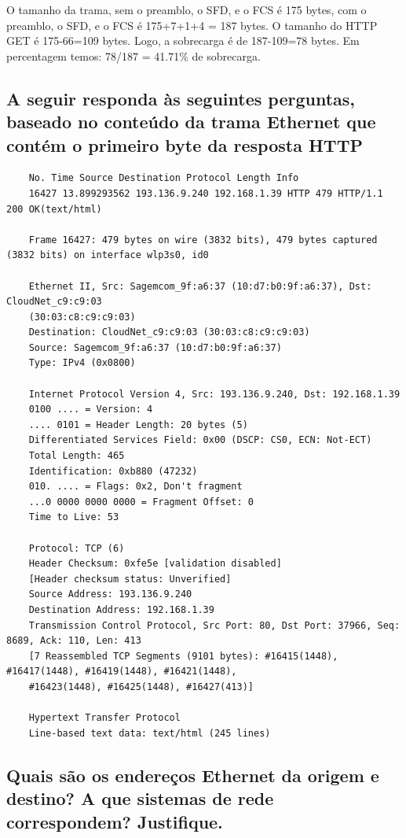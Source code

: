 O tamanho da trama, sem o preamblo, o SFD, e o FCS é 175 bytes, com o preamblo, o SFD, e o FCS é 175+7+1+4 = 187 bytes.
O tamanho do HTTP GET é 175-66=109 bytes. Logo, a sobrecarga é de 187-109=78 bytes.
Em percentagem temos: 78/187 = 41.71\% de sobrecarga.

\subsection*{A seguir responda às seguintes perguntas, baseado no conteúdo da trama Ethernet que
contém o primeiro byte da resposta HTTP}

\begin{verbatim}
    No. Time Source Destination Protocol Length Info
    16427 13.899293562 193.136.9.240 192.168.1.39 HTTP 479 HTTP/1.1 200 OK(text/html)

    Frame 16427: 479 bytes on wire (3832 bits), 479 bytes captured (3832 bits) on interface wlp3s0, id0

    Ethernet II, Src: Sagemcom_9f:a6:37 (10:d7:b0:9f:a6:37), Dst: CloudNet_c9:c9:03
    (30:03:c8:c9:c9:03)
    Destination: CloudNet_c9:c9:03 (30:03:c8:c9:c9:03)
    Source: Sagemcom_9f:a6:37 (10:d7:b0:9f:a6:37)
    Type: IPv4 (0x0800)

    Internet Protocol Version 4, Src: 193.136.9.240, Dst: 192.168.1.39
    0100 .... = Version: 4
    .... 0101 = Header Length: 20 bytes (5)
    Differentiated Services Field: 0x00 (DSCP: CS0, ECN: Not-ECT)
    Total Length: 465
    Identification: 0xb880 (47232)
    010. .... = Flags: 0x2, Don't fragment
    ...0 0000 0000 0000 = Fragment Offset: 0
    Time to Live: 53

    Protocol: TCP (6)
    Header Checksum: 0xfe5e [validation disabled]
    [Header checksum status: Unverified]
    Source Address: 193.136.9.240
    Destination Address: 192.168.1.39
    Transmission Control Protocol, Src Port: 80, Dst Port: 37966, Seq: 8689, Ack: 110, Len: 413
    [7 Reassembled TCP Segments (9101 bytes): #16415(1448), #16417(1448), #16419(1448), #16421(1448),
    #16423(1448), #16425(1448), #16427(413)]

    Hypertext Transfer Protocol
    Line-based text data: text/html (245 lines)
\end{verbatim}

\subsection{Quais são os endereços Ethernet da origem e destino? A que sistemas de rede
correspondem? Justifique.}

